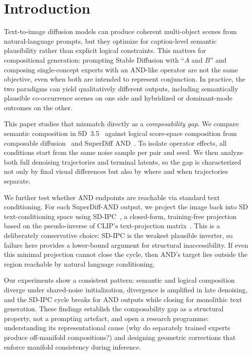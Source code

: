 
\section{Introduction}

Text-to-image diffusion models can produce coherent multi-object scenes from natural-language prompts, but they optimize for caption-level semantic plausibility rather than explicit logical constraints. This matters for compositional generation: prompting Stable Diffusion with ``$A$ and $B$'' and composing single-concept experts with an AND-like operator are not the same objective, even when both are intended to represent conjunction. In practice, the two paradigms can yield qualitatively different outputs, including semantically plausible co-occurrence scenes on one side and hybridized or dominant-mode outcomes on the other.

This paper studies that mismatch directly as a \emph{composability gap}. We compare semantic composition in SD~3.5~\cite{scaling_rectified_flow_transformers_for_high_resolution_image_synthesis} against logical score-space composition from composable diffusion~\cite{liu2022compositional} and SuperDiff AND~\cite{skreta2025the}. To isolate operator effects, all conditions start from the same noise sample per pair and seed. We then analyze both full denoising trajectories and terminal latents, so the gap is characterized not only by final visual differences but also by where and when trajectories separate.

We further test whether AND endpoints are reachable via standard text conditioning. For each SuperDiff-AND output, we project the image back into SD text-conditioning space using SD-IPC~\cite{ding2023sdipc}, a closed-form, training-free projection based on the pseudo-inverse of CLIP's text-projection matrix~\cite{ding2023sdipc}. This is a deliberately conservative choice: SD-IPC is the weakest plausible inverter, so failure here provides a lower-bound argument for structural inaccessibility. If even this minimal projection cannot close the cycle, then AND's target lies outside the region reachable by natural language conditioning.

Our experiments show a consistent pattern: semantic and logical composition diverge under shared-noise initialization, divergence is amplified in late denoising, and the SD-IPC cycle breaks for AND outputs while closing for monolithic text generation. These findings establish the composability gap as a structural property, not a prompting artefact, and open a research programme: understanding its representational cause (why do separately trained experts produce off-manifold compositions?) and designing geometric corrections that enforce manifold consistency during inference.
